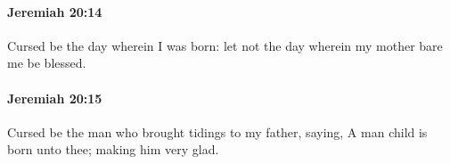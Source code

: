 		\paragraph{Jeremiah 20:14} %
			\label{JEREMIAH-20-14}

			Cursed be the day wherein I was born: let not the day wherein my mother bare me be blessed.


		\paragraph{Jeremiah 20:15} %
			\label{JEREMIAH-20-15}

			Cursed be the man who brought tidings to my father, saying, A man child is born unto thee; making him very glad.



